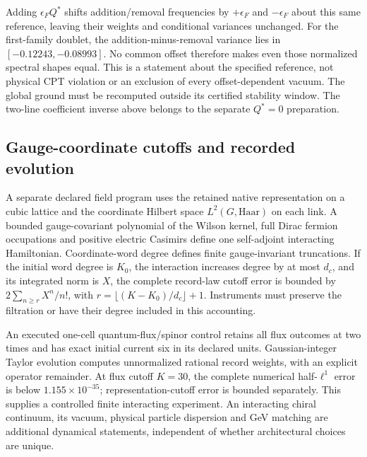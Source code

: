 Adding $\epsilon_F Q^*$ shifts addition/removal frequencies by
$+\epsilon_F$ and $-\epsilon_F$ about this same reference, leaving
their weights and conditional variances unchanged. For the first-family
doublet, the addition-minus-removal variance lies in
$[-0.12243,-0.08993]$. No common offset therefore makes even those
normalized spectral shapes equal. This is a statement about the specified
reference, not physical CPT violation or an exclusion of every
offset-dependent vacuum. The global ground must be recomputed outside
its certified stability window. The two-line coefficient inverse above
belongs to the separate $Q^*=0$ preparation.

\subsection{Gauge-coordinate cutoffs and recorded evolution}

A separate declared field program uses the retained native representation
on a cubic lattice and the coordinate Hilbert space $L^2(G,\mathrm{Haar})$
on each link. A bounded gauge-covariant polynomial of the Wilson kernel,
full Dirac fermion occupations and positive electric Casimirs define one
self-adjoint interacting Hamiltonian. Coordinate-word degree defines
finite gauge-invariant truncations. If the initial word degree is $K_0$,
the interaction increases degree by at most $d_c$, and its integrated norm
is $X$, the complete record-law cutoff error is bounded by
$2\sum_{n\ge r}X^n/n!$, with
$r=\lfloor(K-K_0)/d_c\rfloor+1$. Instruments must preserve the filtration
or have their degree included in this accounting.

An executed one-cell quantum-flux/spinor control retains all flux outcomes
at two times and has exact initial current six in its declared units.
Gaussian-integer Taylor evolution computes unnormalized rational record
weights, with an explicit operator remainder. At flux cutoff $K=30$,
the complete numerical half-$\ell^1$ error is below
$1.155\times10^{-35}$; representation-cutoff error is bounded separately.
This supplies a controlled finite interacting experiment. An interacting
chiral continuum, its vacuum, physical particle dispersion and GeV
matching are additional dynamical statements, independent of whether
architectural choices are unique.

